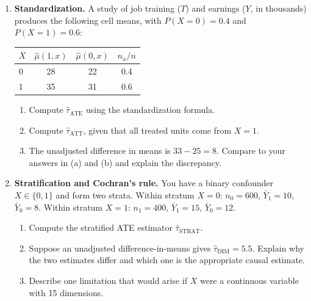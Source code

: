 \documentclass[master.tex]{subfiles}
\begin{document}
\begin{enumerate}
\item \textbf{Standardization.}
  A study of job training ($T$) and earnings ($Y$, in thousands)
  produces the following cell means, with $P(X{=}0) = 0.4$ and
  $P(X{=}1) = 0.6$:
  \begin{center}
  \begin{tabular}{lccc}
  \toprule
  $X$ & $\hat\mu(1,x)$ & $\hat\mu(0,x)$ & $n_x/n$ \\
  \midrule
  0 & 28 & 22 & 0.4 \\
  1 & 35 & 31 & 0.6 \\
  \bottomrule
  \end{tabular}
  \end{center}
  \begin{enumerate}
    \item Compute $\hat\tau_{\mathrm{ATE}}$ using the standardization
      formula.
    \item Compute $\hat\tau_{\mathrm{ATT}}$, given that all treated
      units come from $X{=}1$.
    \item The unadjusted difference in means is $33 - 25 = 8$.  Compare
      to your answers in (a) and (b) and explain the discrepancy.
  \end{enumerate}

\item \textbf{Stratification and Cochran's rule.}
  You have a binary confounder $X \in \{0,1\}$ and form two strata.
  Within stratum $X{=}0$: $n_0 = 600$, $\bar Y_1 = 10$,
  $\bar Y_0 = 8$.  Within stratum $X{=}1$: $n_1 = 400$,
  $\bar Y_1 = 15$, $\bar Y_0 = 12$.
  \begin{enumerate}
    \item Compute the stratified ATE estimator $\hat\tau_{\mathrm{STRAT}}$.
    \item Suppose an unadjusted difference-in-means gives
      $\hat\tau_{\mathrm{DIM}} = 5.5$.  Explain why the two estimates
      differ and which one is the appropriate causal estimate.
    \item Describe one limitation that would arise if $X$ were a
      continuous variable with 15 dimensions.
  \end{enumerate}


\end{enumerate}
\end{document}
